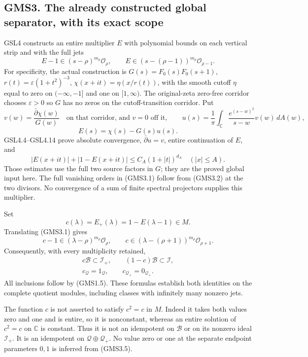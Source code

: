 \subsection{GMS3. The already constructed global separator, with its
exact
scope}\label{gms3.-the-already-constructed-global-separator-with-its-exact-scope}

GSL4 constructs an entire multiplier \(E\) with polynomial bounds on
each vertical strip and with the full jets \[
E-1\in(s-\rho)^{m_\rho}\mathcal O_\rho,\qquad
E\in(s-(\rho-1))^{m_\rho}\mathcal O_{\rho-1}.
\tag{GMS3.1}
\] For specificity, the actual construction is \(G(s)=F_0(s)F_0(s+1)\),
\(r(t)=\varepsilon(1+t^2)^{-3}\), \(\chi(x+it)=\eta(x/r(t))\), with the
smooth cutoff \(\eta\) equal to zero on \(( -\infty,-1]\) and one on
\([1,\infty)\). The original-zeta zero-free corridor chooses
\(\varepsilon>0\) so \(G\) has no zeros on the cutoff-transition
corridor. Put \[
v(w)=\frac{\bar\partial\chi(w)}{G(w)}
\quad\text{on that corridor, and }v=0\text{ off it},\qquad
u(s)=\frac1\pi\int_{\mathbb C}\frac{e^{(s-w)^2}}{s-w}v(w)\,dA(w),
\] \[
E(s)=\chi(s)-G(s)u(s).
\tag{GMS3.2}
\] GSL4.4--GSL4.14 prove absolute convergence, \(\bar\partial u=v\),
entire continuation of \(E\), and \[
|E(x+it)|+|1-E(x+it)|\le C_A(1+|t|)^{d_A}
\quad(|x|\le A).
\tag{GMS3.3}
\] Those estimates use the full two source factors in \(G\); they are
the proved global input here. The full vanishing orders in (GMS3.1)
follow from (GMS3.2) at the two divisors. No convergence of a sum of
finite spectral projectors supplies this multiplier.

Set \[
c(\lambda)=E_+(\lambda)=1-E(\lambda-1)\in M.
\tag{GMS3.4}
\] Translating (GMS3.1) gives \[
c-1\in(\lambda-\rho)^{m_\rho}\mathcal O_\rho,\qquad
c\in(\lambda-(\rho+1))^{m_\rho}\mathcal O_{\rho+1}.
\tag{GMS3.5}
\] Consequently, with every multiplicity retained, \[
\begin{gathered}
c\mathcal B\subset\mathcal I_+,\qquad
(1-c)\mathcal B\subset\mathcal I,\\
c_{\mathcal Q}=1_{\mathcal Q},\qquad
c_{\mathcal Q_+}=0_{\mathcal Q_+}.
\end{gathered}
\tag{GMS3.6}
\] All inclusions follow by (GMS1.5). These formulas establish both
identities on the complete quotient modules, including classes with
infinitely many nonzero jets.

The function \(c\) is not asserted to satisfy \(c^2=c\) in \(M\). Indeed
it takes both values zero and one and is entire, so it is nonconstant,
whereas an entire solution of \(c^2=c\) on \(\mathbb C\) is constant.
Thus it is not an idempotent on \(\mathcal B\) or on its nonzero ideal
\(\mathcal I_+\). It is an idempotent on
\(\mathcal Q\oplus\mathcal Q_+\). No value zero or one at the separate
endpoint parameters \(0,1\) is inferred from (GMS3.5).

